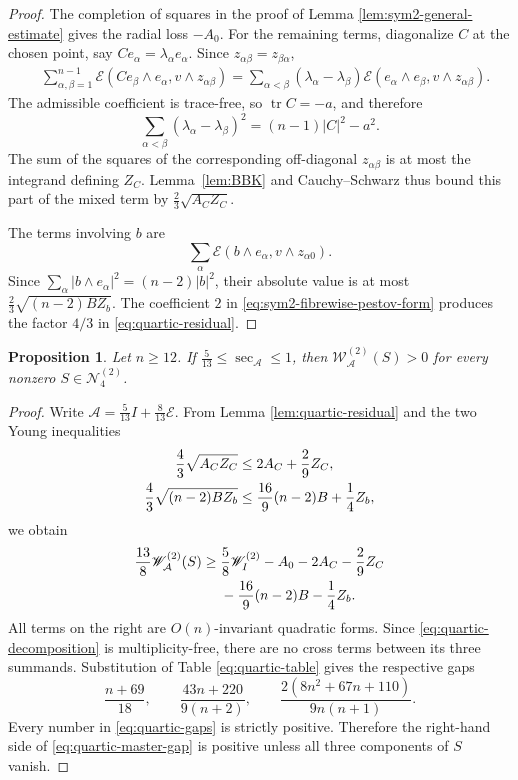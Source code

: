 \documentclass[reqno,11pt]{amsart}
\newtheorem{proposition}[theorem]{Proposition}
\theoremstyle{definition}
\newcommand{\cA}{\mathcal A}
\newcommand{\cE}{\mathcal E}
\newcommand{\tr}{\operatorname{tr}}
\begin{document}
\begin{proof}
The completion of squares in the proof of
Lemma \ref{lem:sym2-general-estimate} gives the radial loss $-A_0$.  For the
remaining terms, diagonalize $C$ at the chosen point, say
$Ce_\alpha=\lambda_\alpha e_\alpha$. Since $z_{\alpha\beta}=z_{\beta\alpha}$,
\begin{align*}
 &\sum_{\alpha,\beta=1}^{n-1}
 \cE(Ce_\beta\wedge e_\alpha,v\wedge z_{\alpha\beta})=
 \sum_{\alpha<\beta}(\lambda_\alpha-\lambda_\beta)
 \cE(e_\alpha\wedge e_\beta,v\wedge z_{\alpha\beta}).
\end{align*}
The admissible coefficient is trace-free, so $\tr C=-a$, and therefore
$$
 \sum_{\alpha<\beta}(\lambda_\alpha-\lambda_\beta)^2
 =(n-1)|C|^2-a^2.
$$
The sum of the squares of the corresponding off-diagonal
$z_{\alpha\beta}$ is at most the integrand defining $Z_C$.  Lemma~\ref{lem:BBK}
and Cauchy--Schwarz thus bound this part of the mixed
term by $\frac23\sqrt{A_CZ_C}$.

The terms involving $b$ are
$$
 \sum_\alpha\cE(b\wedge e_\alpha,v\wedge z_{\alpha0}).
$$
Since $\sum_\alpha|b\wedge e_\alpha|^2=(n-2)|b|^2$, their absolute value is
at most $\frac23\sqrt{(n-2)BZ_b}$.  The coefficient $2$ in
\eqref{eq:sym2-fibrewise-pestov-form} produces the factor $4/3$ in
\eqref{eq:quartic-residual}.
\end{proof}

\begin{proposition}
\label{prop:sym2-quartic}
Let $n\geq12$. If
$\frac5{13}\leq\sec_{\cA}\leq1$, then
$
  \mathscr W^{(2)}_{\cA}(S)>0
$
for every nonzero $S\in\mathscr N^{(2)}_4$.
\end{proposition}

\begin{proof}
Write $\cA=\frac5{13}I+\frac8{13}\cE$.  From
Lemma \ref{lem:quartic-residual} and the two Young inequalities
\begin{align}
 \frac43\sqrt{A_CZ_C}
 &\leq2A_C+\frac29Z_C,\label{eq:quartic-young-one}\\
 \frac43\sqrt{(n-2)BZ_b}
 &\leq\frac{16}{9}(n-2)B+\frac14Z_b,
 \notag
\end{align}
we obtain
\begin{align}
 \frac{13}{8}\mathscr W^{(2)}_{\cA}(S)
 \geq{}&\frac58\mathscr W_I^{(2)}-A_0-2A_C-\frac29Z_C\notag\\
 &-\frac{16}{9}(n-2)B-\frac14Z_b.
 \label{eq:quartic-master-gap}
\end{align}
All terms on the right are $O(n)$-invariant quadratic forms.  Since
\eqref{eq:quartic-decomposition} is multiplicity-free, there are no cross
terms between its three summands. Substitution of
Table \eqref{eq:quartic-table} gives the respective gaps
\begin{equation}\label{eq:quartic-gaps}
 \frac{n+69}{18},
 \qquad
 \frac{43n+220}{9(n+2)},
 \qquad
 \frac{2(8n^2+67n+110)}{9n(n+1)}.
\end{equation}
Every number in \eqref{eq:quartic-gaps} is strictly positive. Therefore the
right-hand side of \eqref{eq:quartic-master-gap} is positive unless all
three components of $S$ vanish.
\end{proof}
\end{document}
